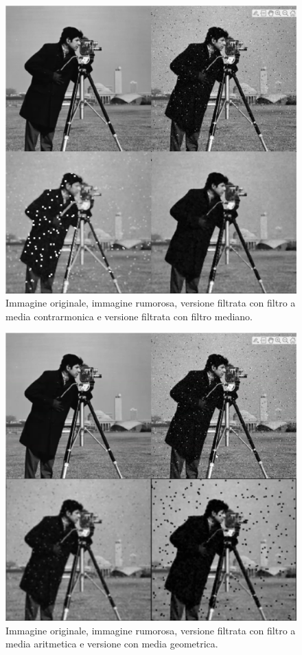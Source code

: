 \documentclass[a4paper,11pt]{article}
\begin{document}
\renewcommand{\thefigure}{8.1}
\begin{figure}[!h]
  \centering
    \includegraphics[scale=0.25]{images/8/cameraman_mint_noise_contraharm_median.png}
    \caption{Immagine originale, immagine rumorosa, versione filtrata con filtro a media contrarmonica e versione filtrata con filtro mediano.}
\end{figure}

\renewcommand{\thefigure}{8.2}
\begin{figure}[!h]
  \centering
    \includegraphics[scale=0.25]{images/8/cameraman_mint_noise_arithavg_geomavg.png}
    \caption{Immagine originale, immagine rumorosa, versione filtrata con filtro a media aritmetica e versione con media geometrica.}
\end{figure}
\end{document}
